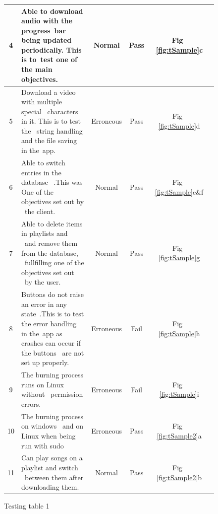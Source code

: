 \documentclass{article}
\begin{document}
\begin{figure}[H]
\begin{center}
\begin{tabular} { | c | p{5cm} | c | c | c | c |}
            4               &Able to download   audio with the progress\
                             bar being updated periodically. This is to\
                             test one of the main objectives.          &      Normal            &       Pass       & Fig ~\ref{fig:tSample}c \\ \hline
            5               &Download a video with multiple special    \
                             characters in it. This is to test the     \
                             string handling and the file saving in the\
                             app.                                      &      Erroneous         &       Pass       & Fig ~\ref{fig:tSample}d \\ \hline
            6               &Able to switch entries in the database    \
                            .This was One of the objectives set out by \
                            the client.                                &      Normal            &       Pass       &Fig ~\ref{fig:tSample}e\&f\\ \hline
            7               &Able to delete items in playlists and     \
                             and remove them from the database,        \
                             fullfilling one of the objectives set out \
                             by the user.                              &      Normal            &       Pass       & Fig ~\ref{fig:tSample}g \\ \hline
            8               &Buttons do not raise an error in any state\
                             .This is to test the error handling in the\
                             app as crashes can occur if the buttons   \
                             are not set up properly.                  &      Erroneous\cite{e1}&       Fail       & Fig ~\ref{fig:tSample}h \\ \hline
            9               &The burning process runs on Linux without \
                            permission errors.                         &      Erroneous\cite{e2}&       Fail       & Fig ~\ref{fig:tSample}i \\ \hline
            10              &The burning process       on windows      \
                             and on Linux when being run with sudo     &      Erroneous         &       Pass       & Fig ~\ref{fig:tSample2}a\\ \hline
            11              &Can play songs on a playlist and switch   \
                             between them after downloading them.      &      Normal            &       Pass       & Fig ~\ref{fig:tSample2}b\\ \hline
        \end{tabular}
    \end{center}
    \caption{Testing table 1} \label{fig:testTable1}
\end{figure}
\end{document}
